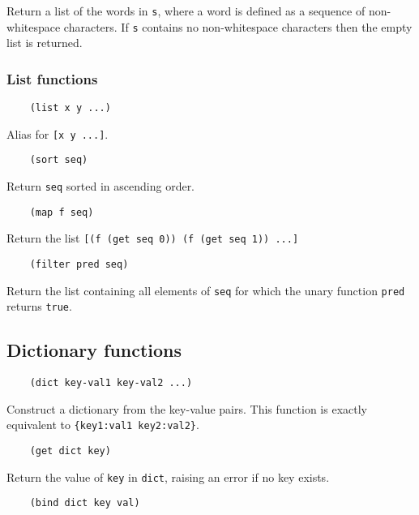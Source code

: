 \documentclass{article}
\newcommand{\inlinecode}{\texttt}
\begin{document}
Return a list of the words in \inlinecode{s}, where a word is defined as a sequence of non-whitespace characters. If \inlinecode{s} contains no non-whitespace characters then the empty list is returned.

\subsubsection{List functions}
\begin{verbatim}
    (list x y ...)
\end{verbatim}

Alias for \inlinecode{[x y ...]}.

\begin{verbatim}
    (sort seq)
\end{verbatim}

Return \inlinecode{seq} sorted in ascending order.

\begin{verbatim}
    (map f seq)
\end{verbatim}

Return the list \inlinecode{[(f (get seq 0)) (f (get seq 1)) ...]}

\begin{verbatim}
    (filter pred seq)
\end{verbatim}

Return the list containing all elements of \inlinecode{seq} for which the unary function \inlinecode{pred} returns \inlinecode{true}.

\subsection{Dictionary functions}
\begin{verbatim}
    (dict key-val1 key-val2 ...)
\end{verbatim}

Construct a dictionary from the key-value pairs. This function is exactly equivalent to \inlinecode{\{key1:val1 key2:val2\}}.

\begin{verbatim}
    (get dict key)
\end{verbatim}

Return the value of \inlinecode{key} in \inlinecode{dict}, raising an error if no key exists.

\begin{verbatim}
    (bind dict key val)
\end{verbatim}
\end{document}
